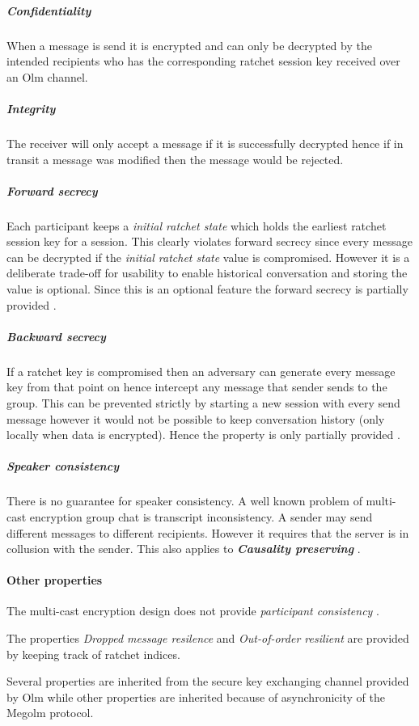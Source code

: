 \subparagraph{Confidentiality} When a message is send it is encrypted and can only be decrypted by the intended recipients who has the corresponding ratchet session key received over an Olm channel. 

\subparagraph{Integrity} The receiver will only accept a message if it is successfully decrypted hence if in transit a message was modified then the message would be rejected. 


\subparagraph{Forward secrecy} Each participant keeps a \emph{initial ratchet state} which holds the earliest ratchet session key for a session. This clearly violates forward secrecy since every message can be decrypted if the \emph{initial ratchet state} value is compromised. However it is a deliberate trade-off for usability to enable historical conversation and storing the value is optional. Since this is an optional feature the forward secrecy is partially provided \cite{ncc}. 


\subparagraph{Backward secrecy} If a ratchet key is compromised then an adversary can generate every message key from that point on hence intercept any message that sender sends to the group. This can be prevented strictly by starting a new session with every send message however it would not be possible to keep conversation history (only locally when data is encrypted). Hence the property is only partially provided \cite{ncc}.



\subparagraph{Speaker consistency}

There is no guarantee for speaker consistency. A well known problem of multi-cast encryption group chat is transcript inconsistency. A sender may send different messages to different recipients. However it requires that the server is in collusion with the sender. This also applies to \emph{\textbf{Causality preserving}} \cite{ncc}.


\paragraph{Other properties}

The multi-cast encryption design does not provide \emph{participant consistency} \cite{sok}.

The properties \emph{Dropped message resilence} and \emph{Out-of-order resilient} are provided by keeping track of ratchet indices. 

Several properties are inherited from the secure key exchanging channel provided by Olm while other properties are inherited because of asynchronicity of the Megolm protocol.

